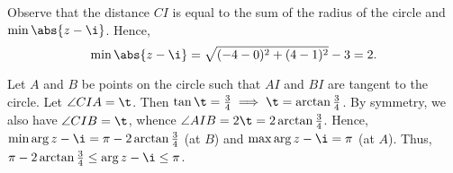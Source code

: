 \begin{solution}
\begin{ppart}
\begin{center}
        \end{center}
    \end{ppart}
    \begin{ppart}
        Observe that the distance $CI$ is equal to the sum of the radius of the circle and $\min \abs{z - \i}$. Hence, \[\min \abs{z - \i} = \sqrt{(-4 - 0)^2 + (4 - 1)^2} - 3 = 2.\]
    \end{ppart}
    \begin{ppart}
        Let $A$ and $B$ be points on the circle such that $AI$ and $BI$ are tangent to the circle. Let $\angle CIA = \t$. Then $\tan \t = \frac34 \implies \t = \arctan \frac34$. By symmetry, we also have $\angle CIB = \t$, whence $\angle AIB = 2\t = 2\arctan \frac34$. Hence, $\min \arg{z -\i} = \pi - 2\arctan \frac34$ (at $B$) and $\max \arg{z - \i} = \pi$ (at $A$). Thus, $\pi - 2\arctan \frac34 \leq \arg{z-\i} \leq \pi$.
    \end{ppart}
\end{solution}

